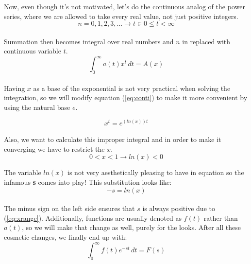 \documentclass{article}
\begin{document}
Now, even though it's not motivated, let's do the continuous analog of the power series, where we are allowed to take every real value, not just positive integers.\\
\begin{equation}
    n = 0,1,2,3,... \rightarrow t \in {0 \leq t < \infty}
\end{equation}\\

\noindent Summation then becomes integral over real numbers and $n$ in replaced with continuous variable $t$.\\ 

\begin{equation}
\label{eq:conti}
    \int_0^{\infty} a(t)x^t \, dt = A(x)
\end{equation}\\

\noindent Having $x$ as a base of the exponential is not very practical  when solving the integration, so we will modify equation (\ref{eq:conti}) to make it more convenient by using the natural base $e$.

\begin{equation}
    x^t = e^{(ln(x))t}
\end{equation}\\

\noindent Also, we want to calculate this improper integral and in order to make it converging we have to restrict the $x$.\\
\begin{equation}
\label{eq:xrange}
    0 < x < 1 \rightarrow ln(x) < 0
\end{equation}

\newpage

The variable $ln(x)$ is not very aesthetically pleasing to have in equation so the infamous \textbf{s} comes into play! This substitution looks like:\\
\begin{equation}
    -s = ln(x)
\end{equation}\\

\noindent The minus sign on the left side ensures that $s$ is always positive due to (\ref{eq:xrange}). Additionally, functions are usually denoted as $f(t)$ rather than $a(t)$, so we will make that change as well, purely for the looks. After all these cosmetic changes, we finally end up with:\\

\begin{equation}
\label{eq:laplace}
    \int_0^{\infty} f(t)e^{-st} \, dt = F(s)
\end{equation}\\
\end{document}
